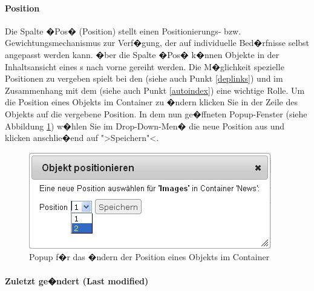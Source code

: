 \paragraph{Position}
Die Spalte �Pos� (Position) stellt einen Positionierungs- bzw.
Gewichtungsmechanismus zur Verf�gung, der auf individuelle Bed�rfnisse
selbst angepasst werden kann. �ber die Spalte �Pos� k�nnen Objekte in
der Inhaltsansicht eines s nach vorne gereiht
werden. Die M�glichkeit spezielle Positionen zu vergeben spielt bei
den  (siehe auch Punkt \ref{deplinks}) und
im Zusammenhang mit dem  (siehe auch Punkt
\ref{autoindex}) eine wichtige Rolle.
Um die Position eines Objekts im Container zu �ndern klicken Sie in der Zeile des Objekts auf die vergebene Position. In dem nun ge�ffneten Popup-Fenster (siehe Abbildung \ref{fig:positionpp}) w�hlen Sie im Drop-Down-Men� die neue Position aus und klicken anschlie�end auf ">Speichern"<.

\begin{figure}[!ht]
  \centering
  \includegraphics[scale=0.5]{./images/position-popup.jpg}
  \caption{Popup f�r das �ndern der Position eines Objekts im Container}
  \label{fig:positionpp}
\end{figure}


\paragraph{Zuletzt ge�ndert (Last modified)}

